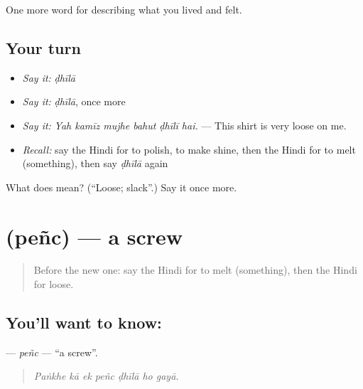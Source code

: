 \begin{grammarlens}[title={What you've built}]
One more word for describing what you lived and felt.
\end{grammarlens}

\subsection*{Your turn}
\begin{itemize}
\raggedright
  \item \emph{Say it:} \emph{ḍhīlā}
  \item \emph{Say it:} \emph{ḍhīlā}, once more
  \item \emph{Say it:} \emph{Yah kamīz mujhe bahut ḍhīlī hai.} — This shirt is very loose on me.
  \item \emph{Recall:} say the Hindi for to polish, to make shine, then the Hindi for to melt (something), then say \emph{ḍhīlā} again
\end{itemize}

\begin{tcolorbox}[breakable,colback=teal!4,colframe=teal!35!black,title={Before you move on}]
What does  mean? (\textquotedblleft{}Loose; slack\textquotedblright{}.) Say it once more.
\end{tcolorbox}
\section[\texorpdfstring{\hi{पेंच} (peñc)}{पेंच (peñc)}]{ (peñc) — a screw}

\label{lesson:HI-C515-penc}



\begin{quote}
Before the new one: say the Hindi for to melt (something), then the Hindi for loose.
\end{quote}

\subsection*{You'll want to know: }
\textbf{} — \emph{peñc} — \textquotedblleft{}a screw\textquotedblright{}.

\begin{quote}
      
\end{quote}

\begin{quote}
\emph{Paṅkhe kā ek peñc ḍhīlā ho gayā.}
\end{quote}

